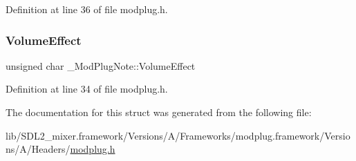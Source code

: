 Definition at line 36 of file modplug.\+h.

\mbox{\label{struct___mod_plug_note_a059cfb2a3a219c45713a00d351b75813}} 
\subsubsection{\texorpdfstring{VolumeEffect}{VolumeEffect}}
{\footnotesize\ttfamily unsigned char \+\_\+\+Mod\+Plug\+Note\+::\+Volume\+Effect}



Definition at line 34 of file modplug.\+h.



The documentation for this struct was generated from the following file\+:\begin{DoxyCompactItemize}
\item 
lib/\+S\+D\+L2\+\_\+mixer.\+framework/\+Versions/\+A/\+Frameworks/modplug.\+framework/\+Versions/\+A/\+Headers/\mbox{\hyperlink{modplug_8h}{modplug.\+h}}\end{DoxyCompactItemize}
